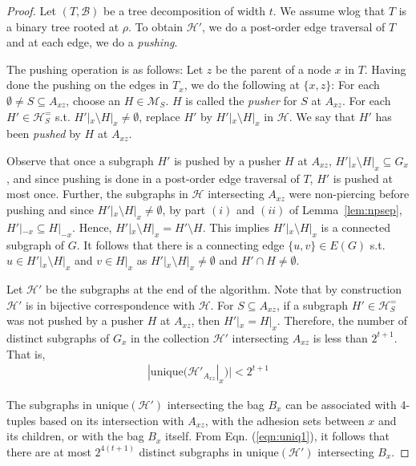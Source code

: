 \documentclass[12pt]{article}
\newcommand{\HH}{\mathcal{H}}
\newcommand{\unique}{\textrm{unique}}
\theoremstyle{case}
\begin{document}
\begin{proof}
Let $(T,\mathcal{B})$ be a tree decomposition of width $t$. We assume wlog
that $T$ is a binary tree rooted at $\rho$.
To obtain $\mathcal{H}'$, we
do a post-order edge traversal of $T$ and at each
edge, we do a \emph{pushing}. 

The pushing operation is as follows:
Let $z$ be the parent of a node $x$ in $T$.
Having done the pushing on the edges in $T_x$, we do the
following at $\{x,z\}$: 
For each $\emptyset\neq S\subseteq A_{xz}$, choose an $H\in\mathcal{M}_S$.
$H$ is called the \emph{pusher} for $S$ at $A_{xz}$. 
For each $H'\in\mathcal{H}^=_S$ s.t. $H'|_x\setminus H|_x\neq\emptyset$,
replace $H'$ by $H'|_x\setminus H|_x$ in $\mathcal{H}$. 
We say that $H'$ has been \emph{pushed}
by $H$ at $A_{xz}$. 

Observe that once a subgraph $H'$ is pushed by a pusher $H$
at $A_{xz}$, $H'|_x\setminus H|_x\subseteq G_x$, and since pushing is
done in a post-order edge traversal of $T$, 
$H'$ is pushed at most once.
Further, the subgraphs in
$\HH$ intersecting $A_{xz}$ were non-piercing before pushing and
since $H'|_x\setminus H|_x\neq\emptyset$, by part $(i)$ and $(ii)$ of Lemma~\ref{lem:npsep},
$H'|_{-x}\subseteq H|_{-x}$. Hence,
$H'|_x\setminus H|_x=H'\setminus H$. This implies
$H'|_x\setminus H|_x$ is a connected subgraph of $G$.
It follows that there
is a connecting edge $\{u,v\}\in E(G)$ s.t.
$u\in H'|_x\setminus H|_x$ and $v\in H|_x$ as
$H'|_x\setminus H|_x\neq\emptyset$ and $H'\cap H\neq\emptyset$.

Let $\mathcal{H}'$ be the subgraphs at the end of the algorithm.
Note that by construction $\mathcal{H}'$ is in bijective correspondence
with $\mathcal{H}$.
For $S\subseteq A_{xz}$,
if a subgraph $H'\in\HH^{=}_S$ was not pushed by a pusher $H$ at $A_{xz}$, then
$H'|_x=H|_x$. 
Therefore, the number of distinct subgraphs of $G_x$ in the collection $\mathcal{H}'$ intersecting $A_{xz}$ is less than
$2^{t+1}$. That is, 
\begin{align}
\label{eqn:uniq1}
|\unique(\mathcal{H}'_{A_{xz}}|_x)|<2^{t+1}
\end{align}

The subgraphs in $\unique(\HH')$ intersecting the bag $B_x$ can be 
associated with 4-tuples based on its intersection with $A_{xz}$, with the
adhesion sets between $x$ and its children, or with the bag $B_x$ itself.
From Eqn. (\ref{eqn:uniq1}), it follows that there are at most $2^{4(t+1)}$ distinct subgraphs in $\unique(\HH')$ intersecting $B_x$.


\end{proof}
\end{document}
